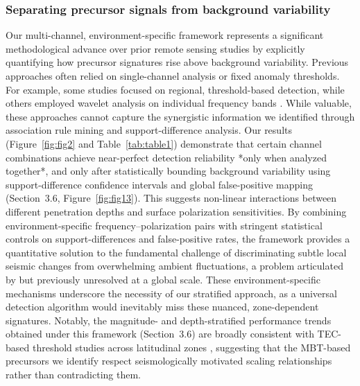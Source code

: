 \documentclass[preprint,review,12pt,authoryear]{elsarticle}
\begin{document}
\subsubsection{Separating precursor signals from background variability}
Our multi-channel, environment-specific framework represents a significant methodological advance over prior remote sensing studies by explicitly quantifying how precursor signatures rise above background variability. Previous approaches often relied on single-channel analysis or fixed anomaly thresholds. For example, some studies focused on regional, threshold-based detection, while others employed wavelet analysis on individual frequency bands \citep{liuPreearthquakeMBTAnomalies2023,wuIdentifyingSeismicAnomalies2024}. While valuable, these approaches cannot capture the synergistic information we identified through association rule mining and support-difference analysis. Our results (Figure~\ref{fig:fig2} and Table~\ref{tab:table1}) demonstrate that certain channel combinations achieve near-perfect detection reliability *only when analyzed together*, and only after statistically bounding background variability using support-difference confidence intervals and global false-positive mapping (Section~3.6, Figure~\ref{fig:fig13}). This suggests non-linear interactions between different penetration depths and surface polarization sensitivities. By combining environment-specific frequency--polarization pairs with stringent statistical controls on support-differences and false-positive rates, the framework provides a quantitative solution to the fundamental challenge of discriminating subtle local seismic changes from overwhelming ambient fluctuations, a problem articulated by \citet{maedaDiscriminationLocalFaint2008} but previously unresolved at a global scale. These environment-specific mechanisms underscore the necessity of our stratified approach, as a universal detection algorithm would inevitably miss these nuanced, zone-dependent signatures. Notably, the magnitude- and depth-stratified performance trends obtained under this framework (Section~3.6) are broadly consistent with TEC-based threshold studies across latitudinal zones \citep{shahTotalElectronContent2020}, suggesting that the MBT-based precursors we identify respect seismologically motivated scaling relationships rather than contradicting them.
\end{document}
